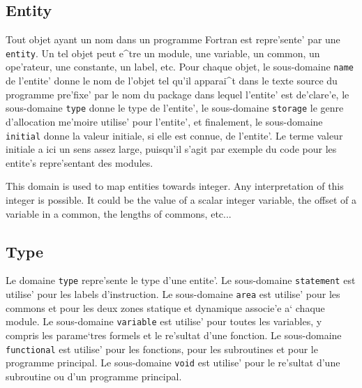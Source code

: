 \subsection{Entity}
\label{subsection-entity}


Tout objet ayant un nom dans un programme Fortran est repre'sente' par
une \verb/entity/. Un tel objet peut e^tre un module, une variable, un
common, un ope'rateur, une constante, un label, etc. Pour chaque objet,
le sous-domaine \verb/name/ de l'entite' donne le nom de l'objet tel
qu'il apparai^t dans le texte source du programme pre'fixe' par le nom du
package dans lequel l'entite' est de'clare'e, le sous-domaine
\verb/type/ donne le type de l'entite', le sous-domaine \verb/storage/
le genre d'allocation me'moire utilise' pour l'entite', et finalement,
le sous-domaine \verb/initial/ donne la valeur initiale, si elle est
connue, de l'entite'. Le terme valeur initiale a ici un sens assez
large, puisqu'il s'agit par exemple du code pour les entite's
repre'sentant des modules.


This domain is used to map entities towards integer. Any interpretation
of this integer is possible. It could be the value of a scalar integer
variable, the offset of a variable in a common, the lengths of commons, etc...

\subsection{Type}
\label{subsection-type}


Le domaine \verb/type/ repre'sente le type d'une entite'.  Le
sous-domaine \verb/statement/ est utilise' pour les labels
d'instruction.  Le sous-domaine \verb/area/ est utilise' pour les
commons et pour les deux zones statique et dynamique associe'e a` chaque
module.  Le sous-domaine \verb/variable/ est utilise' pour toutes les
variables, y compris les parame`tres formels et le re'sultat d'une
fonction.  Le sous-domaine \verb/functional/ est utilise' pour les
fonctions, pour les subroutines et pour le programme principal.  Le
sous-domaine \verb/void/ est utilise' pour le re'sultat d'une subroutine
ou d'un programme principal.

